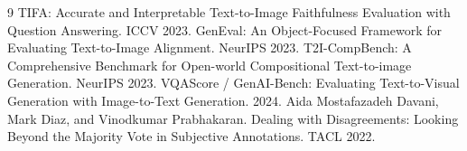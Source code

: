 \documentclass[11pt]{article}
\begin{document}
\begin{thebibliography}{9}
 TIFA: Accurate and Interpretable Text-to-Image Faithfulness Evaluation with Question Answering. ICCV 2023.
 GenEval: An Object-Focused Framework for Evaluating Text-to-Image Alignment. NeurIPS 2023.
 T2I-CompBench: A Comprehensive Benchmark for Open-world Compositional Text-to-image Generation. NeurIPS 2023.
 VQAScore / GenAI-Bench: Evaluating Text-to-Visual Generation with Image-to-Text Generation. 2024.
 Aida Mostafazadeh Davani, Mark Diaz, and Vinodkumar Prabhakaran. Dealing with Disagreements: Looking Beyond the Majority Vote in Subjective Annotations. TACL 2022.
\end{thebibliography}
\end{document}
